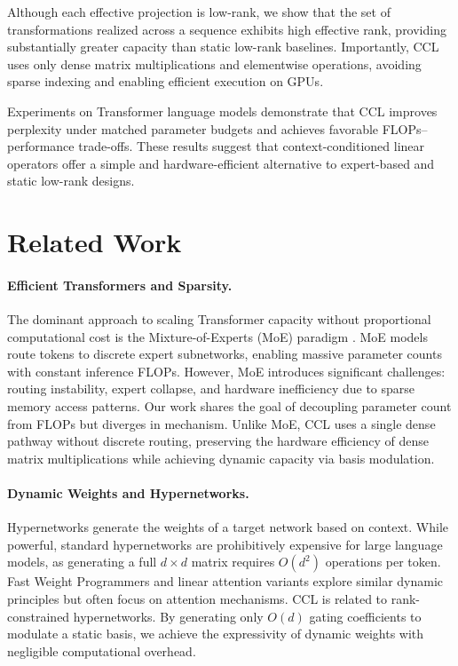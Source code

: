 \documentclass[11pt]{article}
\begin{document}
Although each effective projection is low-rank, we show that the set of transformations realized across a sequence exhibits high effective rank, providing substantially greater capacity than static low-rank baselines. Importantly, CCL uses only dense matrix multiplications and elementwise operations, avoiding sparse indexing and enabling efficient execution on GPUs.

Experiments on Transformer language models demonstrate that CCL improves perplexity under matched parameter budgets and achieves favorable FLOPs–performance trade-offs. These results suggest that context-conditioned linear operators offer a simple and hardware-efficient alternative to expert-based and static low-rank designs.
\section{Related Work}

\paragraph{Efficient Transformers and Sparsity.}
The dominant approach to scaling Transformer capacity without proportional computational cost is the Mixture-of-Experts (MoE) paradigm \cite{shazeer2017outrageously, lepikhin2020gshard}. MoE models route tokens to discrete expert subnetworks, enabling massive parameter counts with constant inference FLOPs. However, MoE introduces significant challenges: routing instability, expert collapse, and hardware inefficiency due to sparse memory access patterns. Our work shares the goal of decoupling parameter count from FLOPs but diverges in mechanism. Unlike MoE, CCL uses a single dense pathway without discrete routing, preserving the hardware efficiency of dense matrix multiplications while achieving dynamic capacity via basis modulation.

\paragraph{Dynamic Weights and Hypernetworks.}
Hypernetworks \cite{ha2016hypernetworks} generate the weights of a target network based on context. While powerful, standard hypernetworks are prohibitively expensive for large language models, as generating a full $d \times d$ matrix requires $O(d^2)$ operations per token. Fast Weight Programmers \cite{schlag2021linear} and linear attention variants explore similar dynamic principles but often focus on attention mechanisms. CCL is related to rank-constrained hypernetworks. By generating only $O(d)$ gating coefficients to modulate a static basis, we achieve the expressivity of dynamic weights with negligible computational overhead.
\end{document}
